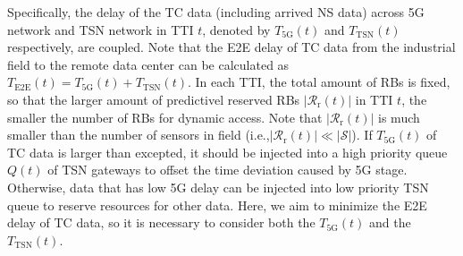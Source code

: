 \documentclass{SCIS2021}
\begin{document}
	\par {\color{blue}Specifically, the delay of the TC data (including arrived NS data) across 5G network and TSN network in TTI $t$, denoted by $T_\text{5G}(t)$ and  $T_\text{TSN}(t)$ respectively, are coupled. Note that the E2E delay of TC data from the industrial field to the  remote data center can be calculated as $T_\text{E2E}(t) = T_\text{5G}(t) + T_\text{TSN}(t)$.} In each TTI, the total amount of RBs is fixed, so that the larger amount of predictivel reserved RBs $\left|\mathcal{R}_\mathrm{r}(t)\right|$ in TTI $t$, the smaller the number of RBs for dynamic access. Note that $\left|\mathcal{R}_\mathrm{r}(t)\right|$ is much smaller than the number of sensors in field (i.e.,$\left|\mathcal{R}_\mathrm{r}(t)\right|\ll\left|\mathcal{S}\right|$). {\color{blue}If $T_\text{5G}(t)$ of TC data is larger than excepted, it should be injected into a high priority queue $Q(t)$ of TSN gateways to offset the time deviation caused by 5G stage. Otherwise, data that has low 5G delay can be injected into low priority TSN queue to reserve resources for other data. Here, we aim to minimize the E2E delay of TC data, so it is necessary to consider both the $T_\text{5G}(t)$ and the $T_\text{TSN}(t)$.}
	
	
	\par {} 
	
	
	
	
\end{document}
